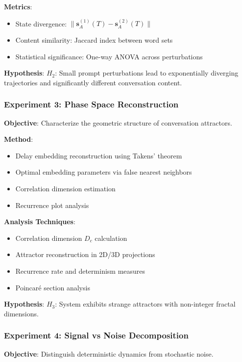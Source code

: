 \documentclass[11pt,a4paper]{article}
\begin{document}
\textbf{Metrics}:
\begin{itemize}
    \item State divergence: $\|\mathbf{s}_A^{(1)}(T) - \mathbf{s}_A^{(2)}(T)\|$
    \item Content similarity: Jaccard index between word sets
    \item Statistical significance: One-way ANOVA across perturbations
\end{itemize}

\textbf{Hypothesis}: $H_2$: Small prompt perturbations lead to exponentially diverging trajectories and significantly different conversation content.

\subsubsection{Experiment 3: Phase Space Reconstruction}

\textbf{Objective}: Characterize the geometric structure of conversation attractors.

\textbf{Method}:
\begin{itemize}
    \item Delay embedding reconstruction using Takens' theorem \cite{takens}
    \item Optimal embedding parameters via false nearest neighbors
    \item Correlation dimension estimation
    \item Recurrence plot analysis
\end{itemize}

\textbf{Analysis Techniques}:
\begin{itemize}
    \item Correlation dimension $D_c$ calculation
    \item Attractor reconstruction in 2D/3D projections
    \item Recurrence rate and determinism measures
    \item Poincaré section analysis
\end{itemize}

\textbf{Hypothesis}: $H_3$: System exhibits strange attractors with non-integer fractal dimensions.

\subsubsection{Experiment 4: Signal vs Noise Decomposition}

\textbf{Objective}: Distinguish deterministic dynamics from stochastic noise.
\end{document}
